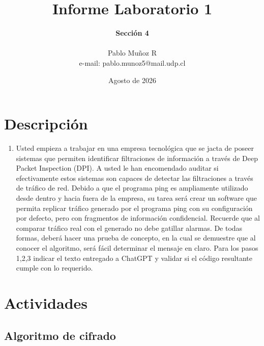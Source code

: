 \documentclass[letter,12pt]{article}
\begin{document}
%
   \title{\Huge{Informe Laboratorio 1}}

   \author{\textbf{Sección 4} \\  \\Pablo Muñoz R \\ e-mail: pablo.munoz5@mail.udp.cl}
          
   \date{Agosto de 2026}

   \maketitle
   
   \tableofcontents
 
  \newpage
  

\section{Descripción}

\begin{enumerate}
    \item  Usted empieza a trabajar en una empresa tecnológica que se jacta de poseer sistemas que permiten identificar filtraciones de información a través de Deep Packet Inspection (DPI).
    A usted le han encomendado auditar si efectivamente estos sistemas son capaces de detectar las filtraciones a través de tráfico de red. Debido a que el programa ping es ampliamente utilizado desde dentro y hacia fuera de la empresa, su tarea será crear un software que permita replicar tráfico generado por el programa ping con su configuración por defecto, pero con fragmentos de información confidencial. Recuerde que al comparar tráfico real con el generado no debe gatillar alarmas.
    De todas formas, deberá hacer una prueba de concepto, en la cual se demuestre que al conocer el algoritmo, será fácil determinar el mensaje en claro.
    Para los pasos 1,2,3 indicar el texto entregado a ChatGPT y validar si el código resultante cumple con lo requerido.


\end{enumerate}


\section{Actividades}


\subsection{Algoritmo de cifrado}
\end{document}
